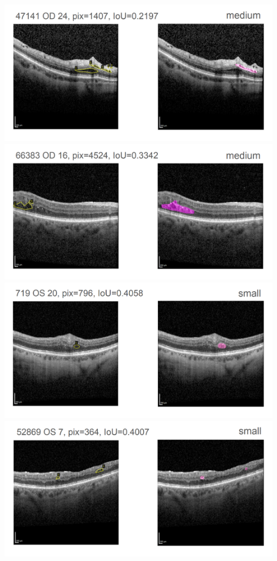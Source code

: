 \includegraphics[width=0.9\textwidth]{./pic/Segmentierung/Segmentierungsergebnisse/5.PNG}
\includegraphics[width=0.9\textwidth]{./pic/Segmentierung/Segmentierungsergebnisse/6.PNG}
\includegraphics[width=0.9\textwidth]{./pic/Segmentierung/Segmentierungsergebnisse/7.PNG}
\includegraphics[width=0.9\textwidth]{./pic/Segmentierung/Segmentierungsergebnisse/8.PNG}
